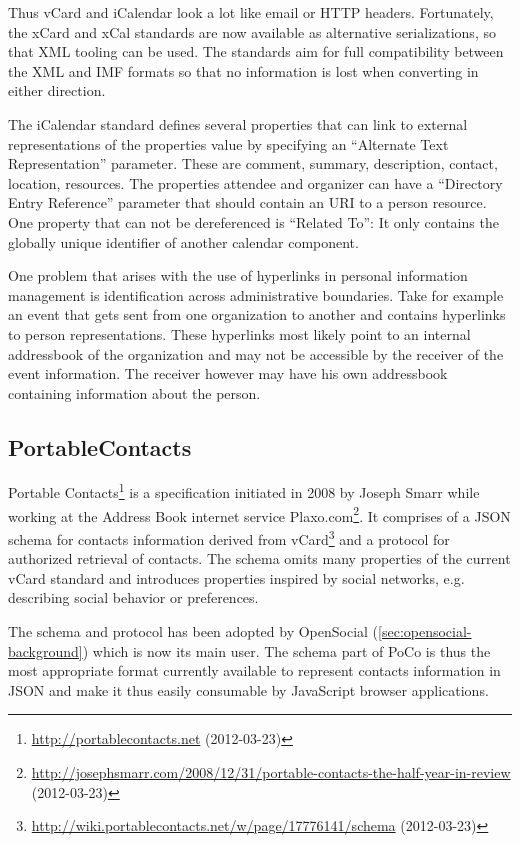 \documentclass[12pt,a4paper,twoside]{scrartcl}		%
\newcommand{\citeurl}[2]{\url{#1} (#2)}
\begin{document}
Thus vCard and iCalendar look a lot like email or HTTP headers. Fortunately, the
xCard\cite{RFC6351} and xCal\cite{RFC6321} standards are now available as
alternative serializations, so that XML tooling can be used. The standards aim
for full compatibility between the XML and IMF formats so that no information is
lost when converting in either direction.

The iCalendar standard defines several properties that can link to external
representations of the properties value by specifying an ``Alternate Text
Representation'' parameter. These are comment, summary, description, contact,
location, resources. The properties attendee and organizer can have a
``Directory Entry Reference'' parameter that should contain an URI to a person
resource. One property that can not be dereferenced is ``Related To'': It only
contains the globally unique identifier of another calendar component.

One problem that arises with the use of hyperlinks in personal information
management is identification across administrative boundaries. Take for example
an event that gets sent from one organization to another and contains hyperlinks
to person representations. These hyperlinks most likely point to an internal
addressbook of the organization and may not be accessible by the receiver of the
event information. The receiver however may have his own addressbook containing
information about the person.

\subsection{PortableContacts}
\label{sec:portablecontacts}

Portable Contacts\footnote{\citeurl{http://portablecontacts.net}{2012-03-23}} is
a specification initiated in 2008 by Joseph Smarr while working at the Address
Book internet service
Plaxo.com\footnote{\citeurl{http://josephsmarr.com/2008/12/31/portable-contacts-the-half-year-in-review}{2012-03-23}}. It
comprises of a JSON schema for contacts information derived from
vCard\footnote{\citeurl{http://wiki.portablecontacts.net/w/page/17776141/schema}{2012-03-23}}
and a protocol for authorized retrieval of contacts. The schema omits many
properties of the current vCard standard\cite{RFC6350} and introduces properties
inspired by social networks, e.g. describing social behavior or preferences.

The schema and protocol has been adopted by OpenSocial
(\autoref{sec:opensocial-background}) which is now its main user. The schema
part of PoCo is thus the most appropriate format currently available to
represent contacts information in JSON and make it thus easily consumable by
JavaScript browser applications.
\end{document}
